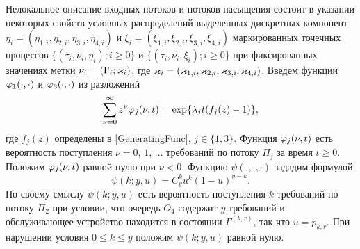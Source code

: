 \documentclass[a4paper,12pt,russian]{extarticle}
\newcommand{\ga}[1]{\Gamma^{\left( #1 \right)} }
\begin{document}
Нелокальное описание входных потоков и потоков насыщения состоит в указании некоторых свойств условных распределений выделенных дискретных компонент $\eta_i=(\eta_{1,i},\eta_{2,i}, \eta_{3,i}, \eta_{4,i})$ и $\xi_i=(\xi_{1,i}, \xi_{2,i}, \xi_{3,i}, \xi_{4,i})$ маркированных точечных процессов \linebreak $\{(\tau_i, \nu_i, \eta_i); i\geqslant 0\}$ и $\{(\tau_i, \nu_i, \xi_i); i\geqslant 0\}$ при фиксированных значениях метки $\nu_i = (\Gamma_i;\varkappa_i)$, где $\varkappa_i=(\varkappa_{1,i},\varkappa_{2,i},\varkappa_{3,i},\varkappa_{4,i})$. 
Введем функции $\varphi_1(\cdot,\cdot)$ и $\varphi_3(\cdot,\cdot)$ из разложений 
\begin{equation*}
\sum_{\nu=0}^{\infty} z^\nu\varphi_j(\nu,t) = \exp\{\lambda_j t (f_j(z)-1)\},
\end{equation*}
где $f_j(z)$ определены в \eqref{GeneratingFunc}, $j \in \{1,3\}$. Функция $\varphi_j(\nu,t)$ есть вероятность поступления $\nu=0$, $1$, $\ldots$ требований по потоку $\Pi_j$ за время $t \geqslant 0$. Положим $\varphi_j(\nu,t)$ равной нулю при $\nu < 0$. Функцию $\psi(\cdot,\cdot,\cdot)$ зададим формулой
\begin{equation*}
\psi(k;y,u)=C_y^k u^k (1-u)^{y-k}.
\end{equation*}
По своему смыслу $\psi(k;y,u)$ есть вероятность поступления $k$ требований по потоку $\Pi_2$ при условии, что очередь $O_4$ содержит $y$ требований и обслуживающее устройство находится в состоянии $\ga{k,r}$, так что $u=p_{k,r}$. При нарушении условия $ 0\leqslant k \leqslant y$ положим $\psi(k;y,u)$ равной нулю.
\end{document}
